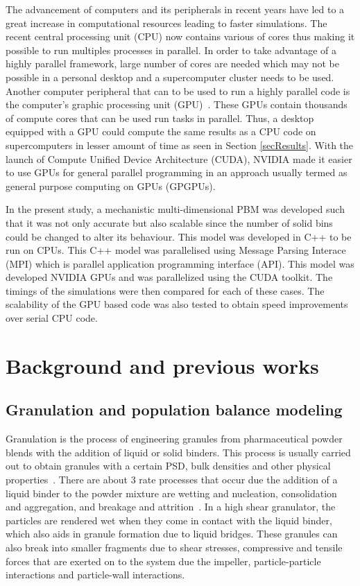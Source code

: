 \documentclass[preprint,10pt,authoryear]{elsarticle}
\begin{document}
\begin{linenumbers}
The advancement of computers and its peripherals in recent years have led to a great increase in 
computational resources leading to faster simulations. The recent central processing unit (CPU) 
now contains various of cores thus making it possible to run multiples processes in parallel. 
In order to take advantage of a highly parallel framework, large number of cores are needed 
which may not be possible in a personal desktop and a supercomputer cluster needs to be used.
Another computer peripheral that can to be used to run a highly parallel code is the computer's 
graphic processing unit (GPU)~\citep{Prakash2013b}. These GPUs contain thousands of compute 
cores that can be used run tasks in parallel. Thus, a desktop equipped with a GPU could 
compute the same results as a CPU code on supercomputers in lesser amount of time as seen in Section \ref{secResults}.
With the launch of Compute Unified Device Architecture (CUDA), NVIDIA made it easier to use GPUs for 
general parallel programming in an approach usually termed as general purpose computing on GPUs (GPGPUs).

In the present study, a mechanistic multi-dimensional PBM was developed such that it was not 
only accurate but also scalable since the number of solid bins could be changed to alter its 
behaviour. This model was developed in C++ to be run on CPUs. This C++ model was parallelised 
using Message Parsing Interace (MPI) which is parallel application programming interface (API). 
This model was developed NVIDIA GPUs and was parallelized using the CUDA toolkit. The timings of 
the simulations were then compared for each of these cases. The scalability of the GPU based code 
was also tested to obtain speed improvements over serial CPU code.


\section{Background and previous works}
\label{secBkgd}
\subsection{Granulation and population balance modeling}
Granulation is the process of engineering granules from pharmaceutical powder blends 
with the addition of liquid or solid binders. This process is usually carried out 
to obtain granules with a certain PSD,  bulk densities and other physical properties~\citep{Barrasso2015cerd}.
There are about 3 rate processes that occur due the addition of a liquid binder to the 
powder mixture are wetting and nucleation, consolidation and aggregation, and breakage 
and attrition~\citep{sen2014}. In a high shear granulator, the particles are rendered wet 
when they come in contact with the liquid binder, which also aids in granule formation due to 
liquid bridges. These granules can also break into smaller fragments due to shear stresses, 
compressive and tensile forces that are exerted on to the system due the impeller, 
particle-particle interactions and particle-wall interactions.


\end{linenumbers}
\end{document}
